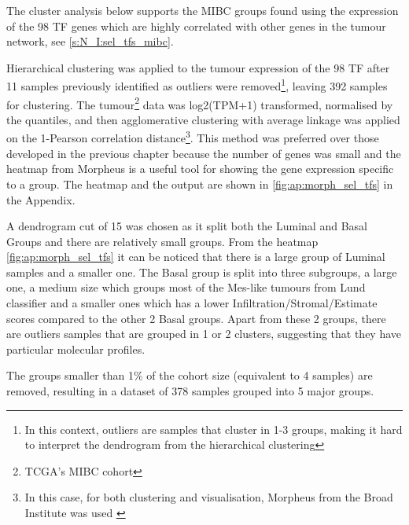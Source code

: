 The cluster analysis below supports the MIBC groups found using the expression of the 98 TF genes which are highly correlated with other genes in the tumour network, see \cref{s:N_I:sel_tfs_mibc}.

Hierarchical clustering was applied to the tumour expression of the 98 TF after 11 samples previously identified as outliers were removed\footnote{In this context, outliers are samples that cluster in 1-3 groups, making it hard to interpret the dendrogram from the hierarchical clustering}, leaving 392 samples for clustering. The tumour\footnote{TCGA's MIBC cohort} data was log2(TPM+1) transformed, normalised by the quantiles, and then agglomerative clustering with average linkage was applied on the 1-Pearson correlation distance\footnote{In this case, for both clustering and visualisation, Morpheus from the Broad Institute was used \cite{Broad-Institute2016-tn}}. This method was preferred over those developed in the previous chapter because the number of genes was small and the heatmap from Morpheus is a useful tool for showing the gene expression specific to a group. The heatmap and the output are shown in \cref{fig:ap:morph_sel_tfs} in the Appendix.

A dendrogram cut of 15 was chosen as it split both the Luminal and Basal Groups and there are relatively small groups. From the heatmap \cref{fig:ap:morph_sel_tfs} it can be noticed that there is a large group of Luminal samples and a smaller one. The Basal group is split into three subgroups, a large one, a medium size which groups most of the Mes-like tumours from Lund classifier and a smaller ones which has a lower Infiltration/Stromal/Estimate scores compared to the other 2 Basal groups. Apart from these 2 groups, there are outliers samples that are grouped in 1 or 2 clusters, suggesting that they have particular molecular profiles.

The groups smaller than 1\% of the cohort size (equivalent to 4 samples) are removed, resulting in a dataset of 378 samples grouped into 5 major groups. 


